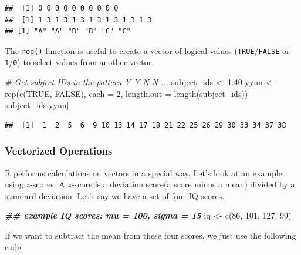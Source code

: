 \documentclass[
  oneside]{book}
\newenvironment{Shaded}{\begin{snugshade}}{\end{snugshade}}
\newcommand{\AttributeTok}[1]{\textcolor[rgb]{0.77,0.63,0.00}{#1}}
\newcommand{\CommentTok}[1]{\textcolor[rgb]{0.56,0.35,0.01}{\textit{#1}}}
\newcommand{\ConstantTok}[1]{\textcolor[rgb]{0.00,0.00,0.00}{#1}}
\newcommand{\DecValTok}[1]{\textcolor[rgb]{0.00,0.00,0.81}{#1}}
\newcommand{\DocumentationTok}[1]{\textcolor[rgb]{0.56,0.35,0.01}{\textbf{\textit{#1}}}}
\newcommand{\FunctionTok}[1]{\textcolor[rgb]{0.00,0.00,0.00}{#1}}
\newcommand{\NormalTok}[1]{#1}
\newcommand{\OtherTok}[1]{\textcolor[rgb]{0.56,0.35,0.01}{#1}}
\newcommand{\SpecialCharTok}[1]{\textcolor[rgb]{0.00,0.00,0.00}{#1}}
\begin{document}
\begin{verbatim}
##  [1] 0 0 0 0 0 0 0 0 0 0
##  [1] 1 3 1 3 1 3 1 3 1 3 1 3 1 3
## [1] "A" "A" "B" "B" "C" "C"
\end{verbatim}

The \texttt{rep()} function is useful to create a vector of logical values (\texttt{TRUE}/\texttt{FALSE} or \texttt{1}/\texttt{0}) to select values from another vector.

\begin{Shaded}
\begin{Highlighting}[]
\CommentTok{\# Get subject IDs in the pattern Y Y N N ...}
\NormalTok{subject\_ids }\OtherTok{\textless{}{-}} \DecValTok{1}\SpecialCharTok{:}\DecValTok{40}
\NormalTok{yynn }\OtherTok{\textless{}{-}} \FunctionTok{rep}\NormalTok{(}\FunctionTok{c}\NormalTok{(}\ConstantTok{TRUE}\NormalTok{, }\ConstantTok{FALSE}\NormalTok{), }\AttributeTok{each =} \DecValTok{2}\NormalTok{, }
            \AttributeTok{length.out =} \FunctionTok{length}\NormalTok{(subject\_ids))}
\NormalTok{subject\_ids[yynn]}
\end{Highlighting}
\end{Shaded}

\begin{verbatim}
##  [1]  1  2  5  6  9 10 13 14 17 18 21 22 25 26 29 30 33 34 37 38
\end{verbatim}

\hypertarget{vectorized_ops}{%
\subsubsection{Vectorized Operations}\label{vectorized_ops}}

R performs calculations on vectors in a special way. Let's look at an example using \(z\)-scores. A \(z\)-score is a deviation score(a score minus a mean) divided by a standard deviation. Let's say we have a set of four IQ scores.

\begin{Shaded}
\begin{Highlighting}[]
\DocumentationTok{\#\# example IQ scores: mu = 100, sigma = 15}
\NormalTok{iq }\OtherTok{\textless{}{-}} \FunctionTok{c}\NormalTok{(}\DecValTok{86}\NormalTok{, }\DecValTok{101}\NormalTok{, }\DecValTok{127}\NormalTok{, }\DecValTok{99}\NormalTok{)}
\end{Highlighting}
\end{Shaded}

If we want to subtract the mean from these four scores, we just use the following code:
\end{document}
